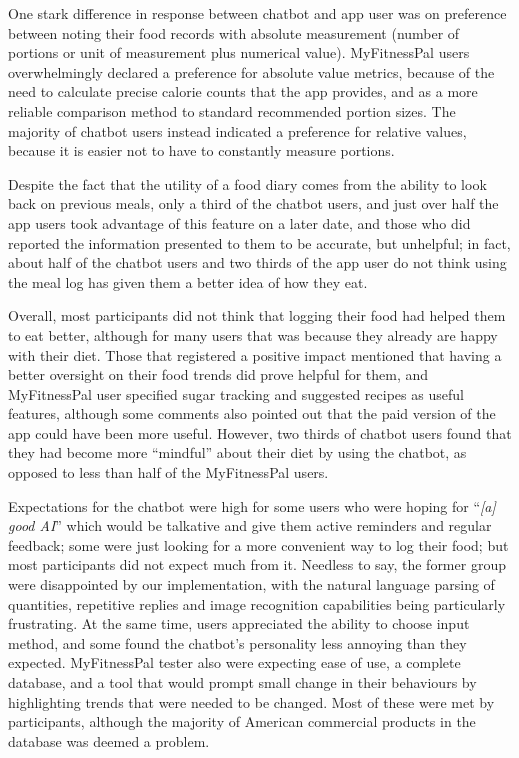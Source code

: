 One stark difference in response between chatbot and app user was on preference between noting their food records with absolute measurement (number of portions or unit of measurement plus numerical value). MyFitnessPal users overwhelmingly declared a preference for absolute value metrics, because of the need to calculate precise calorie counts that the app provides, and as a more reliable comparison method to standard recommended portion sizes. The majority of chatbot users instead indicated a preference for relative values, because it is easier not to have to constantly measure portions. 

Despite the fact that the utility of a food diary comes from the ability to look back on previous meals, only a third of the chatbot users, and just over half the app users took advantage of this feature on a later date, and those who did reported the information presented to them to be accurate, but unhelpful; in fact, about half of the chatbot users and two thirds of the app user do not think using the meal log has given them a better idea of how they eat. 

Overall, most participants did not think that logging their food had helped them to eat better, although for many users that was because they already are happy with their diet. Those that registered a positive impact mentioned that having a better oversight on their food trends did prove helpful for them, and MyFitnessPal user specified sugar tracking and suggested recipes as useful features, although some comments also pointed out that the paid version of the app could have been more useful. However, two thirds of chatbot users found that they had become more ``mindful'' about their diet by using the chatbot, as opposed to less than half of the MyFitnessPal users. 

Expectations for the chatbot were high for some users who were hoping for ``\textit{[a] good AI}'' which would be talkative and give them active reminders and regular feedback; some were just looking for a more convenient way to log their food; but most participants did not expect much from it. Needless to say, the former group were disappointed by our implementation, with the natural language parsing of quantities, repetitive replies and image recognition capabilities being particularly frustrating. At the same time, users appreciated the ability to choose input method, and some found the chatbot's personality less annoying than they expected. MyFitnessPal tester also were expecting ease of use, a complete database, and a tool that would prompt small change in their behaviours by highlighting trends that were needed to be changed. Most of these were met by participants, although the majority of American commercial products in the database was deemed a problem. 

